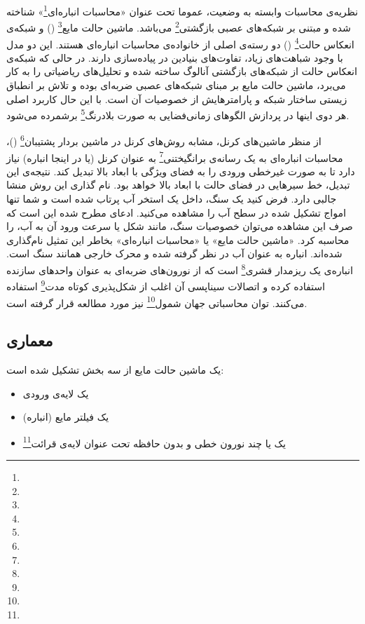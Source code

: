 نظریه‌ی محاسبات وابسته به وضعیت، عموما تحت عنوان «محاسبات انباره‌ای\footnote{}» شناخته شده و مبتنی بر شبکه‌های عصبی بازگشتی\footnote{} می‌باشد. ماشین حالت مایع\footnote{} () \cite{maass2002real} و شبکه‌ی انعکاس حالت\footnote{} () \cite{jaeger2001echo} دو رسته‌ی اصلی از خانواده‌ی محاسبات انباره‌ای هستند. این دو مدل با وجود شباهت‌های زیاد، تفاوت‌های بنیادین در پیاده‌سازی دارند. در حالی که شبکه‌ی انعکاس حالت از شبکه‌های بازگشتی آنالوگ ساخته شده و تحلیل‌های ریاضیاتی را به کار می‌برد، ماشین حالت مایع بر مبنای شبکه‌های عصبی ضربه‌ای بوده و تلاش بر انطباق زیستی ساختار شبکه و پارامتر‌هایش از خصوصیات آن است. با این حال کاربرد اصلی هر دوی اینها در پردازش الگوهای زمانی‌فضایی به صورت بلادرنگ\footnote{} برشمرده می‌شود.

از منظر ماشین‌های کرنل، مشابه روش‌های کرنل در ماشین بردار پشتیبان\footnote{} ()، محاسبات انباره‌ای به یک رسانه‌ی برانگیختنی\footnote{} به عنوان کرنل (یا در اینجا انباره) نیاز دارد تا به صورت غیرخطی ورودی را به فضای ویژگی با ابعاد بالا تبدیل کند. نتیجه‌ی این تبدیل، خط سیرهایی در فضای حالت با ابعاد بالا خواهد بود. نام گذاری این روش منشا جالبی دارد. فرض کنید یک سنگ، داخل یک استخر آب پرتاب شده است و شما تنها امواج تشکیل شده در سطح آب را مشاهده می‌کنید. ادعای مطرح شده این است که صرف این مشاهده می‌توان خصوصیات سنگ، مانند شکل یا سرعت ورود آن به آب، را محاسبه کرد. «ماشین حالت مایع» یا «محاسبات انباره‌ای» بخاطر این تمثیل نام‌گذاری شده‌اند. انباره به عنوان آب در نظر گرفته شده و محرک خارجی همانند سنگ است. انباره‌ی  یک ریزمدار قشری\footnote{} است که از نورون‌های ضربه‌ای به عنوان واحد‌های سازنده استفاده کرده و اتصالات سیناپسی آن اغلب از شکل‌پذیری کوتاه مدت\footnote{} استفاده می‌کنند. توان محاسباتی جهان شمول\footnote{}  نیز مورد مطالعه قرار گرفته است.

\subsection{معماری}
یک ماشین حالت مایع از سه بخش تشکیل شده است:
\begin{itemize}
\item 
یک لایه‌ی ورودی
\item
یک فیلتر مایع (انباره)
\item
یک یا چند نورون خطی و بدون حافظه تحت عنوان لایه‌ی قرائت\footnote{}
\end{itemize}

